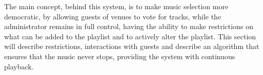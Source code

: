 The main concept, behind this system, is to make music selection more democratic, by allowing guests of venues to vote for tracks, while the administrator remains in full control, having the ability to make restrictions on what can be added to the playlist and to actively alter the playlist. This section will describe restrictions, interactions with guests and describe an algorithm that ensures that the music never stops, providing the system with continuous playback.
